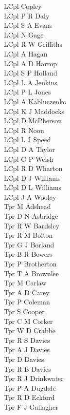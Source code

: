 \begin{multicols}{3}
  LCpl Copley \\
  LCpl P R Daly \\
  LCpl S A Evans \\
  LCpl N Gage \\
  LCpl R W Griffiths \\
  LCpl A Hagan \\
  LCpl A D Harrop \\
  LCpl S P Holland \\
  LCpl L A Jenkins \\
  LCpl P L Jones \\
  LCpl A Kabluczenko \\
  LCpl K J Maddocks \\
  LCpl D McPherson \\
  LCpl R Noon \\
  LCpl L J Speed \\
  LCpl D A Taylor \\
  LCpl G P Welsh \\
  LCpl R D Wharton \\
  LCpl D J Williams \\
  LCpl D L Williams \\
  LCpl J A Wooley \\
  Tpr M Adshead \\
  Tpr D N Asbridge \\
  Tpr R W Bardslcy \\
  Tpr R M Bolton \\
  Tpr G J Borland \\
  Tpr B R Bowers \\
  Tpr P Brotherton \\
  Tpr T A Brownlee \\
  Tpr M Carlaw \\
  Tpr A D Carey \\
  Tpr P Coleman \\
  Tpr S Cooper \\
  Tpr C M Corker \\
  Tpr W D Crabbe \\
  Tpr R S Davies \\
  Tpr A J Davies \\
  Tpr D Davies \\
  Tpr R B Davies \\
  Tpr R J Drinkwater \\
  Tpr P A Dugdale \\
  Tpr R D Eckford \\
  Tpr F J Gallagher \\

\end{multicols}
